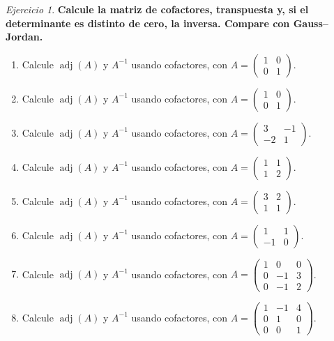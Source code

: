 \documentclass[12pt]{article}
\theoremstyle{remark}
\newtheorem{Ejer}[definicion]{Ejercicio}
\newcommand{\adj}{\operatorname{adj}}
\begin{document}
\begin{Ejer}

\textbf{Calcule la matriz de cofactores, transpuesta y, si el determinante es distinto de cero, la inversa. Compare con Gauss--Jordan.}
\begin{enumerate}[start=187]

\item Calcule $\adj(A)$ y $A^{-1}$ usando cofactores, con $A=\begin{pmatrix}1&0\\0&1\end{pmatrix}$.

\item Calcule $\adj(A)$ y $A^{-1}$ usando cofactores, con $A=\begin{pmatrix}1&0\\0&1\end{pmatrix}$.

\item Calcule $\adj(A)$ y $A^{-1}$ usando cofactores, con $A=\begin{pmatrix}3&-1\\-2&1\end{pmatrix}$.

\item Calcule $\adj(A)$ y $A^{-1}$ usando cofactores, con $A=\begin{pmatrix}1&1\\1&2\end{pmatrix}$.

\item Calcule $\adj(A)$ y $A^{-1}$ usando cofactores, con $A=\begin{pmatrix}3&2\\1&1\end{pmatrix}$.

\item Calcule $\adj(A)$ y $A^{-1}$ usando cofactores, con $A=\begin{pmatrix}1&1\\-1&0\end{pmatrix}$.

\item Calcule $\adj(A)$ y $A^{-1}$ usando cofactores, con $A=\begin{pmatrix}1&0&0\\0&-1&3\\0&-1&2\end{pmatrix}$.

\item Calcule $\adj(A)$ y $A^{-1}$ usando cofactores, con $A=\begin{pmatrix}1&-1&4\\0&1&0\\0&0&1\end{pmatrix}$.


\end{enumerate}
\end{Ejer}
\end{document}
